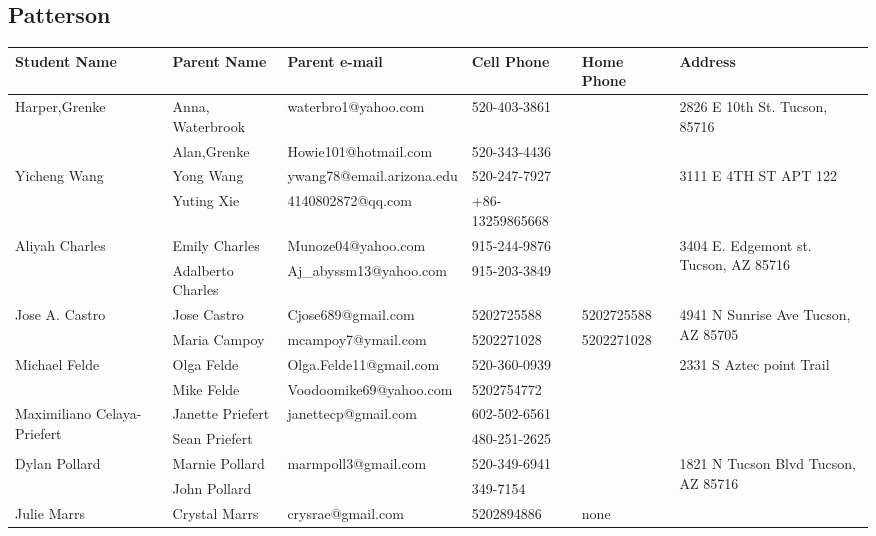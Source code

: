 \documentclass[landscape]{article}\usepackage[]{graphicx}\usepackage[]{color}
\begin{document}
\subsection{Patterson}
\begin{longtable}{p{70pt}|p{75pt}|p{120pt}|p{60pt}|p{60pt}|p{120pt}|}
Student Name & Parent Name & Parent e-mail & Cell Phone & Home Phone & Address\\
\hline
\multirow{2}{70pt}{Harper,Grenke} & Anna, Waterbrook & waterbro1@yahoo.com & 520-403-3861 &  & \multirow{2}{100pt}{2826 E 10th St. Tucson, 85716} \\
 & Alan,Grenke & Howie101@hotmail.com & 520-343-4436 &  & \\
\hline
\multirow{2}{70pt}{Yicheng Wang} & Yong Wang & ywang78@email.arizona.edu & 520-247-7927 &  & \multirow{2}{100pt}{3111 E 4TH ST APT 122} \\
 & Yuting Xie & 4140802872@qq.com & +86-13259865668 &  & \\
\hline
\multirow{2}{70pt}{Aliyah Charles} & Emily Charles & Munoze04@yahoo.com & 915-244-9876 &  & \multirow{2}{100pt}{3404 E. Edgemont st. Tucson, AZ 85716} \\
 & Adalberto Charles & Aj\_abyssm13@yahoo.com & 915-203-3849 &  & \\
\hline
\multirow{2}{70pt}{Jose A. Castro} & Jose Castro & Cjose689@gmail.com & 5202725588 & 5202725588 & \multirow{2}{100pt}{4941 N Sunrise Ave Tucson, AZ 85705} \\
 & Maria Campoy & mcampoy7@ymail.com & 5202271028 & 5202271028 & \\
\hline
\multirow{2}{70pt}{Michael Felde} & Olga Felde & Olga.Felde11@gmail.com & 520-360-0939 &  & \multirow{2}{100pt}{2331 S Aztec point Trail} \\
 & Mike Felde & Voodoomike69@yahoo.com & 5202754772 &  & \\
\hline
\multirow{2}{70pt}{Maximiliano Celaya-Priefert} & Janette Priefert & janettecp@gmail.com & 602-502-6561 &  & \multirow{2}{100pt}{} \\
 & Sean Priefert &  & 480-251-2625 &  & \\
\hline
\multirow{2}{70pt}{Dylan Pollard} & Marnie Pollard & marmpoll3@gmail.com & 520-349-6941 &  & \multirow{2}{100pt}{1821 N Tucson Blvd Tucson, AZ 85716} \\
 & John Pollard &  & 349-7154 &  & \\
\hline
\multirow{2}{70pt}{Julie Marrs} & Crystal Marrs & crysrae@gmail.com & 5202894886 & none & \multirow{2}{100pt}{} \\

\end{longtable}
\end{document}
